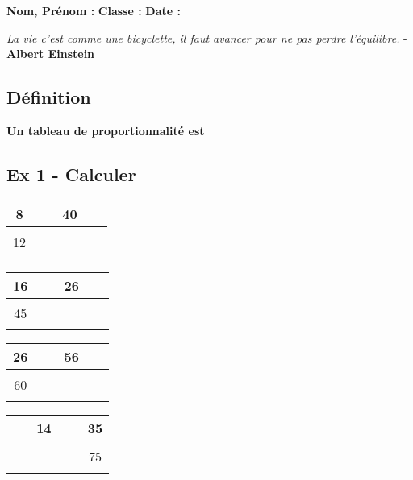 \newpage


\textbf{Nom, Prénom :} \hspace{8cm} \textbf{Classe :} \hspace{3cm} \textbf{Date :}\\
\vspace{-0.8cm}
\begin{center}
  \textit{La vie c’est comme une bicyclette, il faut avancer pour ne pas perdre l’équilibre.} - \textbf{Albert Einstein}
\end{center}
\vspace{-0.8cm}

\subsection*{Définition}

\textbf{Un tableau de proportionnalité est}\dotfill \\ \Pointilles[3] 

\subsection*{Ex 1 - Calculer}


\begin{multicols}{4}\noindent
  \begin{center} \begin{tabular}{|c|c|}  \hline
      8    & 40\\  \hline
      12 & $\phantom{\dfrac{azertyuiop}{O}}$\\  \hline
    \end{tabular} \end{center}
  \Pointilles[2]
  \begin{center} \begin{tabular}{|c|c|}   \hline
      16  & 26\\  \hline
      45 & $\phantom{\dfrac{azertyuiop}{O}}$\\  \hline
    \end{tabular} \end{center}
  \Pointilles[2]
  \begin{center} \begin{tabular}{|c|c|}   \hline
      26  & 56\\  \hline
      60 & $\phantom{\dfrac{azertyuiop}{O}}$\\  \hline
    \end{tabular} \end{center}
  \Pointilles[2]
  \begin{center}\begin{tabular}{|c|c|}  \hline
      14 & 35\\  \hline
      $\phantom{\dfrac{azertyuiop}{O}}$ & 75\\  \hline
    \end{tabular} \end{center}

  \Pointilles[2]

\end{multicols}

